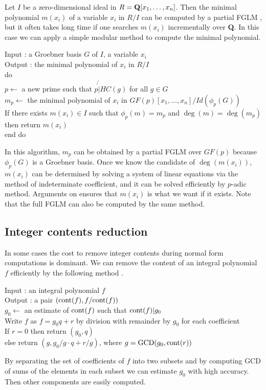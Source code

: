 \documentclass[runningheads]{cl2emult}
\def\cont{{\rm cont}}
\def\GCD{{\rm GCD}}
\begin{document}
Let $I$ be a zero-dimensional ideal in $R={\bf Q}[x_1,\ldots,x_n]$.
Then the minimal polynomial $m(x_i)$ of a variable $x_i$ in $R/I$ can
be computed by a partial FGLM \cite{FGLM}, but it often takes long
time if one searches $m(x_i)$ incrementally over {\bf Q}.  In this
case we can apply a simple modular method to compute the minimal
polynomial.
\begin{tabbing}
Input : a Groebner basis $G$ of $I$, a variable $x_i$\\
Output : the minimal polynomial of $x_i$ in $R/I$\\
do \= \\
\> $p \leftarrow$ a new prime such that $p \not{|} HC(g)$ for all $g \in G$\\
\> $m_p \leftarrow$ the minimal polynomial of $x_i$ in $GF(p)[x_1,\ldots,x_n]/Id(\phi_p(G))$\\
\> If there exists $m(x_i) \in I$ such that $\phi_p(m) = m_p$ and $\deg(m)=\deg(m_p)$\\
\> then return $m(x_i)$\\
end do
\end{tabbing}
In this algorithm, $m_p$ can be obtained by a partial FGLM over
$GF(p)$ because $\phi_p(G)$ is a Groebner basis. Once we know the
candidate of $\deg(m(x_i))$, $m(x_i)$ can be determined by solving a
system of linear equations via the method of indeterminate
coefficient, and it can be solved efficiently by $p$-adic method.
Arguments on \cite{NOYO} ensures that $m(x_i)$ is what we want if it
exists. Note that the full FGLM can also be computed by the same
method.

\subsection{Integer contents reduction}
\label{gbcont}

In some cases the cost to remove integer contents during normal form
computations is dominant. We can remove the content of an integral
polynomial $f$ efficiently by the following method \cite{REPL}.
\begin{tabbing}
Input : an integral polynomial $f$\\
Output : a pair $(\cont(f),f/\cont(f))$\\
$g_0 \leftarrow$ an estimate of $\cont(f)$ such that $\cont(f)|g_0$\\
Write $f$ as $f = g_0q+r$ by division with remainder by $g_0$ for each coefficient\\
If $r = 0$ then return $(g_0,q)$\\
else return $(g,g_0/g \cdot q + r/g)$, where $g = \GCD(g_0,\cont(r))$
\end{tabbing}
By separating the set of coefficients of $f$ into two subsets and by
computing GCD of sums of the elements in each subset we can estimate
$g_0$ with high accuracy. Then other components are easily computed.
\end{document}
